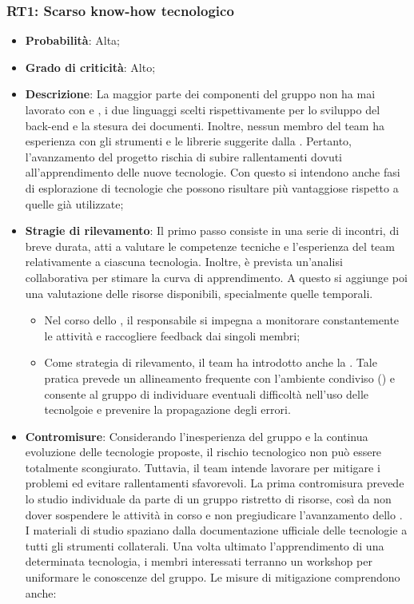 \subsubsection{RT1: Scarso know-how tecnologico}
\begin{itemize}
    \item \textbf{Probabilità}: Alta;
    \item \textbf{Grado di criticità}: Alto;
    \item \textbf{Descrizione}: La maggior parte dei componenti del gruppo non ha mai lavorato con  e , i due linguaggi scelti rispettivamente per lo sviluppo del back-end e la stesura dei documenti. Inoltre, nessun membro del team ha esperienza con gli strumenti e le librerie suggerite dalla . Pertanto, l'avanzamento del progetto rischia di subire rallentamenti dovuti all'apprendimento delle nuove tecnologie. Con questo si intendono anche fasi di esplorazione di tecnologie che possono risultare più vantaggiose rispetto a quelle già utilizzate;
    \item \textbf{Stragie di rilevamento}: Il primo passo consiste in una serie di incontri, di breve durata, atti a valutare le competenze tecniche e l'esperienza del team relativamente a ciascuna tecnologia. Inoltre, è prevista un'analisi collaborativa per stimare la curva di apprendimento. A questo si aggiunge poi una valutazione delle risorse disponibili, specialmente quelle temporali.
    \begin{itemize}
        \item Nel corso dello , il responsabile si impegna a monitorare constantemente le attività e raccogliere feedback dai singoli membri;
        \item Come strategia di rilevamento, il team ha introdotto anche la . Tale pratica prevede un allineamento frequente con l'ambiente condiviso () e consente al gruppo di individuare eventuali difficoltà nell'uso delle tecnolgoie e prevenire la propagazione degli errori. 
    \end{itemize}
    \item \textbf{Contromisure}: Considerando l'inesperienza del gruppo e la continua evoluzione delle tecnologie proposte, il rischio tecnologico non può essere totalmente scongiurato. Tuttavia, il team intende lavorare per mitigare i problemi ed evitare rallentamenti sfavorevoli. La prima contromisura prevede lo studio individuale da parte di un gruppo ristretto di risorse, così da non dover sospendere le attività in corso e non pregiudicare l'avanzamento dello . I materiali di studio spaziano dalla documentazione ufficiale delle tecnologie a tutti gli strumenti collaterali. Una volta ultimato l'apprendimento di una determinata tecnologia, i membri interessati terranno un workshop per uniformare le conoscenze del gruppo. Le misure di mitigazione comprendono anche:

\end{itemize}
